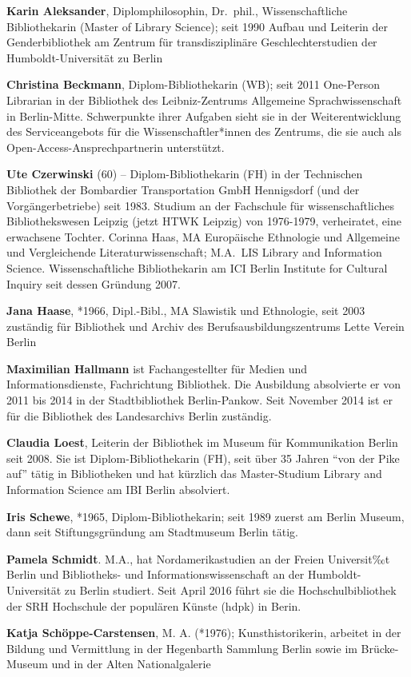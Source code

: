\textbf{Karin Aleksander}, Diplomphilosophin, Dr.~phil.,
Wissenschaftliche Bibliothekarin (Master of Library Science); seit 1990
Aufbau und Leiterin der Genderbibliothek am Zentrum für
transdisziplinäre Geschlechterstudien der Humboldt-Universität zu Berlin

\textbf{Christina Beckmann}, Diplom-Bibliothekarin (WB); seit 2011
One-Person Librarian in der Bibliothek des Leibniz-Zentrums Allgemeine
Sprachwissenschaft in Berlin-Mitte. Schwerpunkte ihrer Aufgaben sieht
sie in der Weiterentwicklung des Serviceangebots für die
Wissenschaftler*innen des Zentrums, die sie auch als
Open-Access-Ansprechpartnerin unterstützt.

\textbf{Ute Czerwinski} (60) -- Diplom-Bibliothekarin (FH) in der
Technischen Bibliothek der Bombardier Transportation GmbH Hennigsdorf
(und der Vorgängerbetriebe) seit 1983. Studium an der Fachschule für
wissenschaftliches Bibliothekswesen Leipzig (jetzt HTWK Leipzig) von
1976-1979, verheiratet, eine erwachsene Tochter. Corinna Haas, MA
Europäische Ethnologie und Allgemeine und Vergleichende
Literaturwissenschaft; M.A.~LIS Library and Information Science.
Wissenschaftliche Bibliothekarin am ICI Berlin Institute for Cultural
Inquiry seit dessen Gründung 2007.

\textbf{Jana Haase}, *1966, Dipl.-Bibl., MA Slawistik und Ethnologie,
seit 2003 zuständig für Bibliothek und Archiv des
Berufsausbildungszentrums Lette Verein Berlin

\textbf{Maximilian Hallmann} ist Fachangestellter für Medien und
Informationsdienste, Fachrichtung Bibliothek. Die Ausbildung absolvierte
er von 2011 bis 2014 in der Stadtbibliothek Berlin-Pankow. Seit November
2014 ist er für die Bibliothek des Landesarchivs Berlin zuständig.

\textbf{Claudia Loest}, Leiterin der Bibliothek im Museum für
Kommunikation Berlin seit 2008. Sie ist Diplom-Bibliothekarin (FH), seit
über 35 Jahren ``von der Pike auf'' tätig in Bibliotheken und hat
kürzlich das Master-Studium Library and Information Science am IBI
Berlin absolviert.

\textbf{Iris Schewe}, *1965, Diplom-Bibliothekarin; seit 1989 zuerst am
Berlin Museum, dann seit Stiftungsgründung am Stadtmuseum Berlin tätig.

\textbf{Pamela Schmidt}. M.A., hat Nordamerikastudien an der Freien
Universit‰t Berlin und Bibliotheks- und Informationswissenschaft an der
Humboldt-Universität zu Berlin studiert. Seit April 2016 führt sie die
Hochschulbibliothek der SRH Hochschule der populären Künste (hdpk) in
Berin.

\textbf{Katja Schöppe-Carstensen}, M. A. (*1976); Kunsthistorikerin,
arbeitet in der Bildung und Vermittlung in der Hegenbarth Sammlung
Berlin sowie im Brücke-Museum und in der Alten Nationalgalerie

